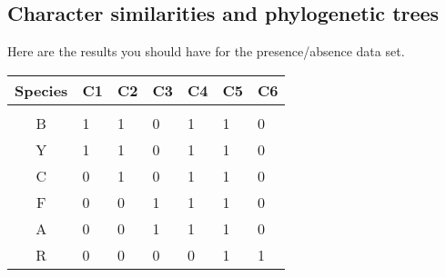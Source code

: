 \documentclass[12pt, addpoints]{exam}
\newcommand*\AnswerBox[2]{%
    \parbox[t][#1]{0.92\textwidth}{%
    \begin{solution}#2\end{solution}}
}
\begin{document}
\subsection*{Character similarities and phylogenetic trees}

Here are the results you should have for the presence/absence data set.

{\liningnum
\begin{longtable}[c]{@{}cC{0.32in}C{0.32in}C{0.32in}C{0.32in}C{0.32in}C{0.32in}@{}}
\toprule
Species & C1 & C2 & C3 & C4 & C5 & C6\tabularnewline
\midrule
	&	&	&	&	&	\tabularnewline
B	&
	1	& 
	1	& 
	0	&
	1	&
	1	&
	0	\tabularnewline[0.15in]
%
Y	& 
	1	&
	1	&
	0	&
	1	&
	1	&
	0	\tabularnewline[0.15in]
%
C	&
	0	&
	1	&
	0	&
	1	& 
	1	&
	0	\tabularnewline[0.15in]
%
F	&
	0	&
	0	&
	1	&
	1	&
	1	&
	0	\tabularnewline[0.15in]
%
A	&	
	0	&
	0	&
	1	&
	1	&
	1	&
	0	\tabularnewline[0.15in]
%
R	&
	0	&
	0	&
	0	&
	0	&
	1	&
	1	\tabularnewline[0.15in]
\bottomrule
\end{longtable}
}




\end{document}
